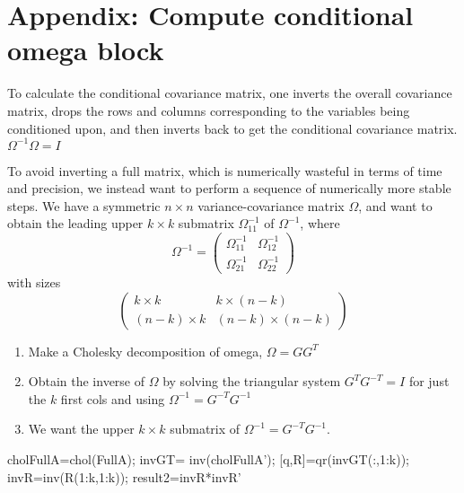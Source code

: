 \section{Appendix: Compute conditional omega block}
To calculate the conditional covariance matrix, 
one inverts the overall covariance matrix, 
drops the rows and columns corresponding to the variables being conditioned upon, and then inverts back to get the conditional covariance matrix.
\begin{math}
\Omega^{-1}\Omega = I
\end{math}

To avoid inverting a full matrix, which is numerically wasteful in terms of time and precision, we instead want to perform a sequence of numerically more stable steps.
We have a symmetric $n\times n$ variance-covariance matrix $\Omega$, and want to obtain the leading upper $k\times k$ submatrix $\Omega^{-1}_{11}$
of $\Omega^{-1}$, where
\[
\Omega^{-1} = \left( \begin{array}{cc}
\Omega^{-1}_{11} & \Omega^{-1}_{12}\\
\Omega^{-1}_{21} & \Omega^{-1}_{22} 
\end{array} \right)
\] with sizes \[
\left(
\begin{array}{cc}
k\times k & k\times (n-k)\\
(n-k)\times k & (n-k)\times (n-k) 
\end{array}
\right)
\] 
\begin{enumerate}
\item Make a Cholesky decomposition of omega, $\Omega=GG^T$
\item Obtain the inverse of $\Omega$ by solving the triangular system $G^{T}G^{-T}=I$ for just the $k$ first cols and using $\Omega^{-1}=G^{-T}G^{-1}$
\item We want the upper $k\times k$ submatrix of $\Omega^{-1}=G^{-T}G^{-1}$.
\end{enumerate}

 


  cholFullA=chol(FullA);
invGT=  inv(cholFullA'); %
[q,R]=qr(invGT(:,1:k));
invR=inv(R(1:k,1:k));
result2=invR*invR' 
